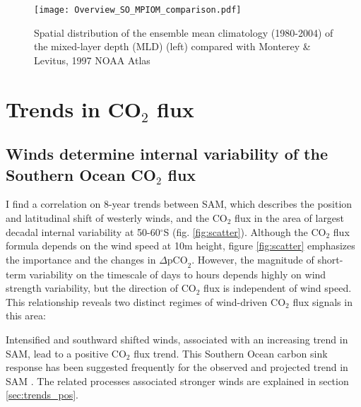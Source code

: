 \documentclass[12pt]{article}
\begin{document}
\begin{figure}[h!]
	\centering
	\texttt{[image: Overview\_SO\_MPIOM\_comparison.pdf]} %
	\caption{Spatial distribution of the ensemble mean climatology (1980-2004) of the mixed-layer depth (MLD) (left) compared with Monterey \& Levitus, 1997 NOAA Atlas}
	\label{fig:SO_comp_zmld}
\end{figure}







\clearpage

\section{Trends in CO$_2$ flux}
\label{ch:trends}

\subsection{Winds determine internal variability of the Southern Ocean CO$_2$ flux}

I find a correlation on 8-year trends between SAM, which describes the position and latitudinal shift of westerly winds, and the CO$_2$ flux in the area of largest decadal internal variability at 50-60$^\circ$S (fig. \ref{fig:scatter}). Although the CO$_2$ flux formula depends on the wind speed at 10m height, figure \ref{fig:scatter} emphasizes the importance and the changes in $\Delta \text{pCO}_2$. However, the magnitude of short-term variability on the timescale of days to hours depends highly on wind strength variability, but the direction of CO$_2$ flux is independent of wind speed. This relationship reveals two distinct regimes of wind-driven CO$_2$ flux signals in this area: 

Intensified and southward shifted winds, associated with an increasing trend in SAM, lead to a positive CO$_2$ flux trend. This Southern Ocean carbon sink response has been suggested frequently for the observed and projected trend in SAM \citep{LeQuere2007,Lovenduski2007,Lovenduski2008,Hauck2013}. The related processes associated stronger winds are explained in section \ref{sec:trends_pos}.
\end{document}
